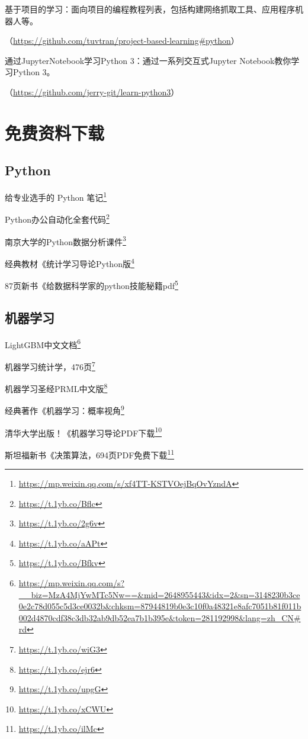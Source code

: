 \documentclass[]{ctexbook}
\renewcommand{\href}[2]{#2\footnote{\url{#1}}}
\begin{document}
基于项目的学习：面向项目的编程教程列表，包括构建网络抓取工具、应用程序机器人等。

（\url{https://github.com/tuvtran/project-based-learning\#python}）

通过JupyterNotebook学习Python 3：通过一系列交互式Jupyter Notebook教你学习Python 3。

（\url{https://github.com/jerry-git/learn-python3}）

\hypertarget{ux514dux8d39ux8d44ux6599ux4e0bux8f7d}{%
\chapter{免费资料下载}\label{ux514dux8d39ux8d44ux6599ux4e0bux8f7d}}

\hypertarget{python-1}{%
\section{Python}\label{python-1}}

\href{https://mp.weixin.qq.com/s/xf4TT-KSTVOejBqOvYzndA}{给专业选手的 Python 笔记}

\href{https://t.1yb.co/Bflc}{Python办公自动化全套代码}

\href{https://t.1yb.co/2g6v}{南京大学的Python数据分析课件}

\href{https://t.1yb.co/aAPt}{经典教材《统计学习导论Python版}

\href{https://t.1yb.co/Bfkv}{87页新书《给数据科学家的python技能秘籍pdf}

\hypertarget{ux673aux5668ux5b66ux4e60-1}{%
\section{机器学习}\label{ux673aux5668ux5b66ux4e60-1}}

\href{https://mp.weixin.qq.com/s?__biz=MzA4MjYwMTc5Nw==\&mid=2648955443\&idx=2\&sn=3148230b3ce0e2c78d055c5d3ce0032b\&chksm=87944819b0e3c10f0a48321e8afc7051b81f011b002d4870cdf38c3db32ab9db52ea7b1b395e\&token=281192998\&lang=zh_CN\#rd}{LightGBM中文文档}

\href{https://t.1yb.co/wiG3}{机器学习统计学，476页}

\href{https://t.1yb.co/ejr6}{机器学习圣经PRML中文版}

\href{https://t.1yb.co/upgG}{经典著作《机器学习：概率视角}

\href{https://t.1yb.co/xCWU}{清华大学出版！《机器学习导论PDF下载}

\href{https://t.1yb.co/ilMc}{斯坦福新书《决策算法，694页PDF免费下载}
\end{document}
